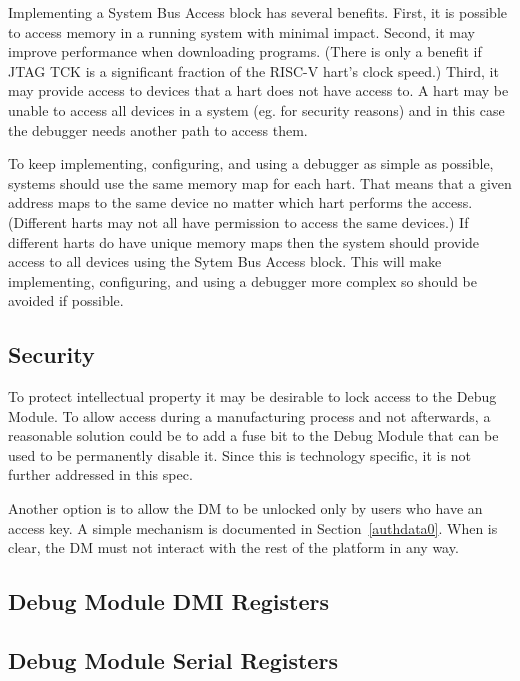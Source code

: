 \documentclass{article}
\begin{document}
Implementing a System Bus Access block has several benefits.
First, it is possible to
access memory in a running system with minimal impact.  Second, it may improve
performance when downloading programs. (There is only a benefit if JTAG TCK is a
significant fraction of the RISC-V hart's clock speed.)  Third, it may provide
access to devices that a hart does not have access to. A hart may be unable to
access all devices in a system (eg. for security reasons) and in this case the
debugger needs another path to access them.

To keep implementing, configuring, and using a debugger as simple as possible,
systems should use the same memory map for each hart. That means that a given
address maps to the same device no matter which hart performs the access.
(Different harts may not all have permission to access the same devices.) If
different harts do have unique memory maps then the system should provide
access to all devices using the Sytem Bus Access block.
This will make implementing,
configuring, and using a debugger more complex so should be avoided if
possible.

\subsection{Security}

To protect intellectual property it may be desirable to lock access to the
Debug Module.  To allow access during a manufacturing process and not
afterwards, a reasonable solution could be to add a fuse bit to the Debug
Module that can be used to be permanently disable it. Since this is technology
specific, it is not further addressed in this spec.

Another option is to allow the DM to be unlocked only by users who  have an
access key. A simple mechanism is documented in Section~\ref{authdata0}. When
\Fauthenticated is clear, the DM must not interact with the rest of the
platform in any way.

\subsection{Debug Module DMI Registers} \label{dmdebbus}



\subsection{Debug Module Serial Registers} \label{dmsysbus}
\end{document}
